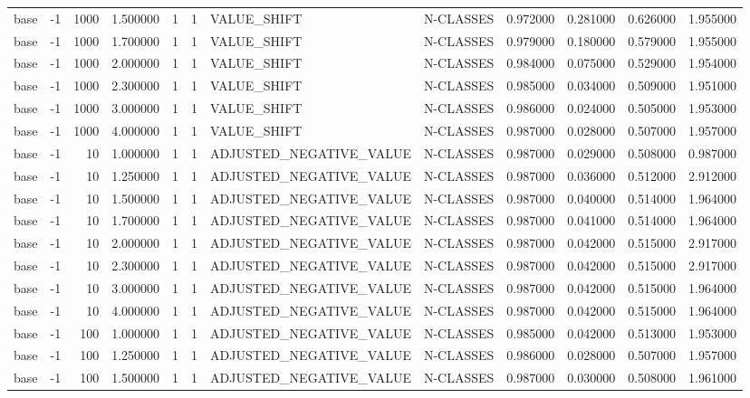 \begin{tabular}{lrrrllllrrrr}
base & -1 & 1000 & 1.500000 & 1 & 1 & VALUE_SHIFT & N-CLASSES & 0.972000 & 0.281000 & 0.626000 & 1.955000 \\
base & -1 & 1000 & 1.700000 & 1 & 1 & VALUE_SHIFT & N-CLASSES & 0.979000 & 0.180000 & 0.579000 & 1.955000 \\
base & -1 & 1000 & 2.000000 & 1 & 1 & VALUE_SHIFT & N-CLASSES & 0.984000 & 0.075000 & 0.529000 & 1.954000 \\
base & -1 & 1000 & 2.300000 & 1 & 1 & VALUE_SHIFT & N-CLASSES & 0.985000 & 0.034000 & 0.509000 & 1.951000 \\
base & -1 & 1000 & 3.000000 & 1 & 1 & VALUE_SHIFT & N-CLASSES & 0.986000 & 0.024000 & 0.505000 & 1.953000 \\
base & -1 & 1000 & 4.000000 & 1 & 1 & VALUE_SHIFT & N-CLASSES & 0.987000 & 0.028000 & 0.507000 & 1.957000 \\
base & -1 & 10 & 1.000000 & 1 & 1 & ADJUSTED_NEGATIVE_VALUE & N-CLASSES & 0.987000 & 0.029000 & 0.508000 & 0.987000 \\
base & -1 & 10 & 1.250000 & 1 & 1 & ADJUSTED_NEGATIVE_VALUE & N-CLASSES & 0.987000 & 0.036000 & 0.512000 & 2.912000 \\
base & -1 & 10 & 1.500000 & 1 & 1 & ADJUSTED_NEGATIVE_VALUE & N-CLASSES & 0.987000 & 0.040000 & 0.514000 & 1.964000 \\
base & -1 & 10 & 1.700000 & 1 & 1 & ADJUSTED_NEGATIVE_VALUE & N-CLASSES & 0.987000 & 0.041000 & 0.514000 & 1.964000 \\
base & -1 & 10 & 2.000000 & 1 & 1 & ADJUSTED_NEGATIVE_VALUE & N-CLASSES & 0.987000 & 0.042000 & 0.515000 & 2.917000 \\
base & -1 & 10 & 2.300000 & 1 & 1 & ADJUSTED_NEGATIVE_VALUE & N-CLASSES & 0.987000 & 0.042000 & 0.515000 & 2.917000 \\
base & -1 & 10 & 3.000000 & 1 & 1 & ADJUSTED_NEGATIVE_VALUE & N-CLASSES & 0.987000 & 0.042000 & 0.515000 & 1.964000 \\
base & -1 & 10 & 4.000000 & 1 & 1 & ADJUSTED_NEGATIVE_VALUE & N-CLASSES & 0.987000 & 0.042000 & 0.515000 & 1.964000 \\
base & -1 & 100 & 1.000000 & 1 & 1 & ADJUSTED_NEGATIVE_VALUE & N-CLASSES & 0.985000 & 0.042000 & 0.513000 & 1.953000 \\
base & -1 & 100 & 1.250000 & 1 & 1 & ADJUSTED_NEGATIVE_VALUE & N-CLASSES & 0.986000 & 0.028000 & 0.507000 & 1.957000 \\
base & -1 & 100 & 1.500000 & 1 & 1 & ADJUSTED_NEGATIVE_VALUE & N-CLASSES & 0.987000 & 0.030000 & 0.508000 & 1.961000 \\

\end{tabular}
